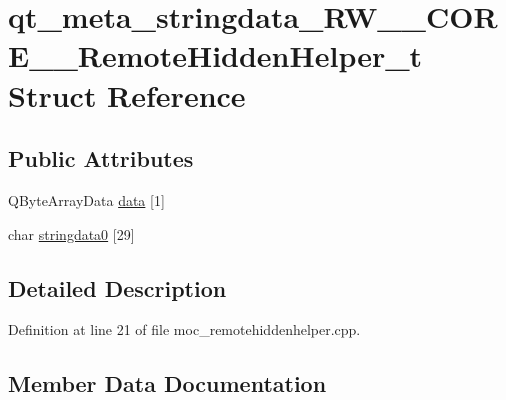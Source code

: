\hypertarget{structqt__meta__stringdata___r_w_____c_o_r_e_____remote_hidden_helper__t}{}\section{qt\+\_\+meta\+\_\+stringdata\+\_\+\+R\+W\+\_\+\+\_\+\+C\+O\+R\+E\+\_\+\+\_\+\+Remote\+Hidden\+Helper\+\_\+t Struct Reference}
\label{structqt__meta__stringdata___r_w_____c_o_r_e_____remote_hidden_helper__t}
\subsection*{Public Attributes}
\begin{DoxyCompactItemize}
\item 
Q\+Byte\+Array\+Data \hyperlink{structqt__meta__stringdata___r_w_____c_o_r_e_____remote_hidden_helper__t_a1571560175539826031952b10eb7cb3c}{data} \mbox{[}1\mbox{]}
\item 
char \hyperlink{structqt__meta__stringdata___r_w_____c_o_r_e_____remote_hidden_helper__t_aff520200e964f9c40cd2d329d5b95a97}{stringdata0} \mbox{[}29\mbox{]}
\end{DoxyCompactItemize}


\subsection{Detailed Description}


Definition at line 21 of file moc\+\_\+remotehiddenhelper.\+cpp.



\subsection{Member Data Documentation}
\hypertarget{structqt__meta__stringdata___r_w_____c_o_r_e_____remote_hidden_helper__t_a1571560175539826031952b10eb7cb3c}{}\label{structqt__meta__stringdata___r_w_____c_o_r_e_____remote_hidden_helper__t_a1571560175539826031952b10eb7cb3c} 

